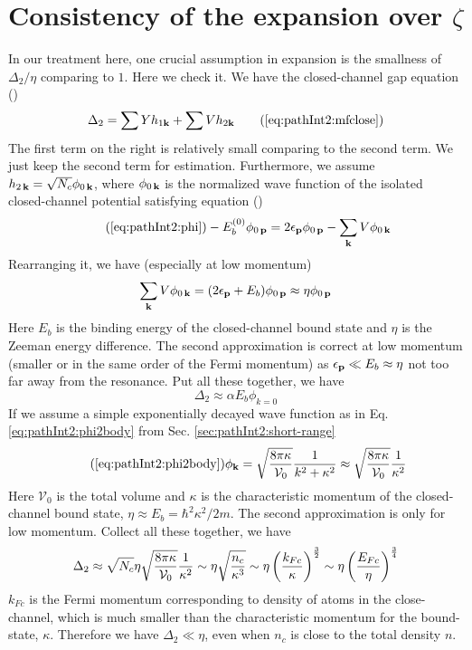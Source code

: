 \section{Consistency of the expansion over $\zeta$\label{sec:pathApp:consistency}}
In our treatment here, one crucial assumption in expansion is the smallness of $\Delta_{2}/\eta$ comparing to $1$.  Here we check it.  We have the closed-channel gap equation ()
\begin{equation}
\Delta_{2}=\sum{}Yh_{1\vk}+\sum{}Vh_{2\vk}\tag{\ref{eq:pathInt2:mfclose}}
\end{equation}
The first term on the right is relatively small comparing to the second term.  We just keep the second term for estimation.  Furthermore,  we assume $h_{2\,\mathbf{k}}=\sqrt{N_{c}}\phi_{0\,\mathbf{k}}$, where $\phi_{0\,\mathbf{k}}$ is the normalized wave function of the  isolated closed-channel potential satisfying \sch equation ()
\begin{equation}\tag{\ref{eq:pathInt2:phi}}
-E_{b}^{(0)}\phi_{0\,\vp}=2\epsilon_{\vp}\phi_{0\,\vp}-\sum_{\vk}V \phi_{0\,\vk}
\end{equation}
Rearranging it, we have (especially at low momentum)
\begin{equation*}
\sum_{\mathbf{k}}V \phi_{0\,\mathbf{k}}=(2\epsilon_{\mathbf{p}}+E_{b})\phi_{0\,\mathbf{p}}\approx{\eta}\phi_{0\,\mathbf{p}}
\end{equation*}
Here $E_{b}$ is the binding energy of the closed-channel bound state and $\eta$ is the Zeeman energy difference. The second approximation is correct at low momentum (smaller or in the same order of the Fermi momentum) as $\epsilon_{\mathbf{p}}\ll{}E_{b}\approx\eta$ not too far away from the resonance.  Put all these together, we have
\begin{equation*}
\Delta_{2}\approx\alpha{}E_{b}\phi_{k=0}
\end{equation*}
If we assume a simple exponentially decayed wave function as in Eq. \ref{eq:pathInt2:phi2body} from Sec. \ref{sec:pathInt2:short-range} 
\begin{equation}\tag{\ref{eq:pathInt2:phi2body}}
\phi_{\vk}=\sqrt{\frac{8\pi\kappa}{\mathcal{V}_{0}}}\frac{1}{k^{2}+\kappa^{2}}\approx\sqrt{\frac{8\pi\kappa}{\mathcal{V}_{0}}}\frac{1}{\kappa^{2}}
\end{equation}
Here  $\mathcal{V}_{0}$ is the total volume and $\kappa$ is the characteristic momentum of the closed-channel bound state, $\eta\approx{}E_{b}=\hbar^{2}\kappa^{2}/2m$.  The second approximation is only for  low momentum.  Collect all these together, we have
\begin{equation}
\Delta_{2}\approx\sqrt{N_{c}}\eta\sqrt{\frac{8\pi\kappa}{\mathcal{V}_{0}}}\frac{1}{\kappa^{2}}
\sim\eta\sqrt\frac{n_{c}}{\kappa^{3}}
\sim\eta\left(\frac{k_{Fc}}{\kappa}\right)^{\frac{3}{2}}
\sim\eta\left(\frac{E_{Fc}}{\eta}\right)^{\frac{3}{4}}
\end{equation}
$k_{Fc}$ is the Fermi momentum corresponding to density of atoms in the close-channel, which is much smaller than the characteristic momentum for the bound-state, $\kappa$.   Therefore we have $\Delta_{2}\ll\eta$, even when $n_{c}$ is close to the total density $n$. 

